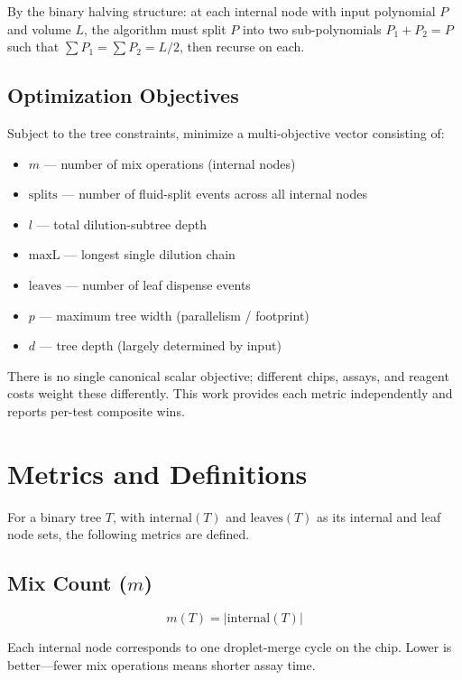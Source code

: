 By the binary halving structure: at each internal node with input polynomial $P$ and volume $L$, the algorithm must split $P$ into two sub-polynomials $P_1 + P_2 = P$ such that $\sum P_1 = \sum P_2 = L/2$, then recurse on each.

\subsection{Optimization Objectives}

Subject to the tree constraints, minimize a multi-objective vector consisting of:
\begin{itemize}
    \item $m$ --- number of mix operations (internal nodes)
    \item $\text{splits}$ --- number of fluid-split events across all internal nodes
    \item $l$ --- total dilution-subtree depth
    \item $\text{maxL}$ --- longest single dilution chain
    \item $\text{leaves}$ --- number of leaf dispense events
    \item $p$ --- maximum tree width (parallelism / footprint)
    \item $d$ --- tree depth (largely determined by input)
\end{itemize}

There is no single canonical scalar objective; different chips, assays, and reagent costs weight these differently. This work provides each metric independently and reports per-test composite wins.

\section{Metrics and Definitions}
\label{sec:metrics}

For a binary tree $T$, with $\text{internal}(T)$ and $\text{leaves}(T)$ as its internal and leaf node sets, the following metrics are defined.

\subsection{Mix Count ($m$)}

\begin{equation}
m(T) = |\text{internal}(T)|
\end{equation}

Each internal node corresponds to one droplet-merge cycle on the chip. Lower is better---fewer mix operations means shorter assay time.

